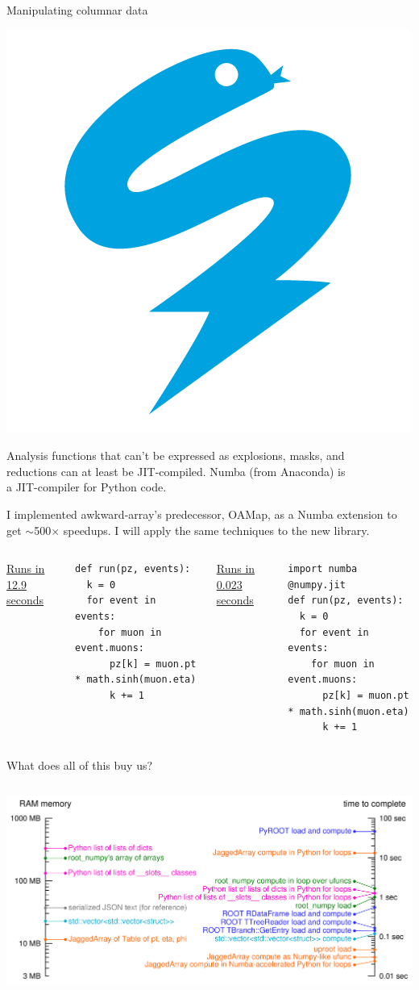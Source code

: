 \documentclass[aspectratio=169]{beamer}
\begin{document}
\begin{frame}[fragile]{Manipulating columnar data}
\vspace{0.5 cm}

\hfill \includegraphics[height=2 cm]{numba-logo.png}

\vspace{-2 cm}

Analysis functions that can't be expressed as explosions, masks, and \\
reductions can at least be JIT-compiled. Numba (from Anaconda) is \\
a JIT-compiler for Python code.

\vspace{0.5 cm}
I implemented awkward-array's predecessor, OAMap, as a Numba extension to get $\sim$500$\times$ speedups. I will apply the same techniques to the new library.

\vspace{0.5 cm}
\begin{columns}[t]
\underline{Runs in 12.9 seconds}

\scriptsize
\vspace{2\baselineskip}
\begin{verbatim}
def run(pz, events):
  k = 0
  for event in events:
    for muon in event.muons:
      pz[k] = muon.pt * math.sinh(muon.eta)
      k += 1
\end{verbatim}

\underline{Runs in 0.023 seconds}

\scriptsize
\begin{verbatim}
import numba
@numpy.jit
def run(pz, events):
  k = 0
  for event in events:
    for muon in event.muons:
      pz[k] = muon.pt * math.sinh(muon.eta)
      k += 1
\end{verbatim}
\end{columns}
\end{frame}

\begin{frame}{What does all of this buy us?}
\vspace{0.3 cm}
\begin{columns}
\includegraphics[width=\linewidth]{logscales.pdf}
\end{columns}
\end{frame}
\end{document}
